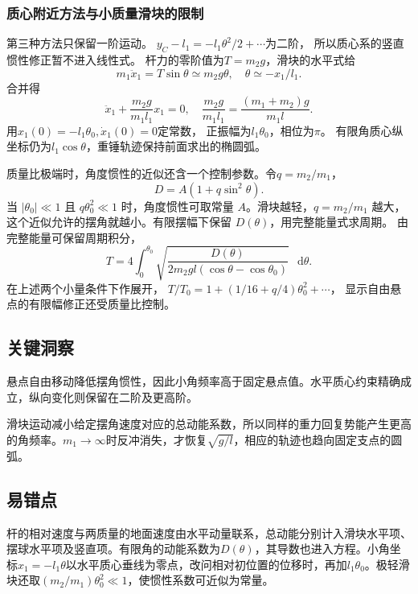 \documentclass[UTF8,fontset=fandol,a4paper,11pt]{ctexart}
\newcommand{\dd}{\mathop{}\!\mathrm{d}}
\begin{document}
\subsubsection*{质心附近方法与小质量滑块的限制}
第三种方法只保留一阶运动。
$y_C-l_1=-l_1\theta^2/2+\cdots$为二阶，
所以质心系的竖直惯性修正暂不进入线性式。
杆力的零阶值为$T=m_2g$，滑块的水平式给
\[
m_1\ddot x_1=T\sin\theta\simeq m_2g\theta,
\quad\theta\simeq-x_1/l_1.
\]
合并得
\[
\ddot x_1+\frac{m_2g}{m_1l_1}x_1=0,
\quad\frac{m_2g}{m_1l_1}=\frac{(m_1+m_2)g}{m_1l}.
\]
用$x_1(0)=-l_1\theta_0,\dot x_1(0)=0$定常数，
正振幅为$l_1\theta_0$，相位为$\pi$。
有限角质心纵坐标仍为$l_1\cos\theta$，重锤轨迹保持前面求出的椭圆弧。

质量比极端时，角度惯性的近似还含一个控制参数。令$q=m_2/m_1$，
\[
D=A(1+q\sin^2\theta).
\]
当 $|\theta_0|\ll1$ 且 $q\theta_0^2\ll1$ 时，角度惯性可取常量 $A$。滑块越轻，$q=m_2/m_1$ 越大，这个近似允许的摆角就越小。有限摆幅下保留 $D(\theta)$，用完整能量式求周期。
由完整能量可保留周期积分，
\[
T=4\int_0^{\theta_0}
\sqrt{\frac{D(\theta)}{2m_2gl(\cos\theta-\cos\theta_0)}}\,\dd\theta.
\]
在上述两个小量条件下作展开，
$T/T_0=1+(1/16+q/4)\theta_0^2+\cdots$，
显示自由悬点的有限幅修正还受质量比控制。




\subsection*{关键洞察}

悬点自由移动降低摆角惯性，因此小角频率高于固定悬点值。水平质心约束精确成立，纵向变化则保留在二阶及更高阶。

滑块运动减小给定摆角速度对应的总动能系数，所以同样的重力回复势能产生更高的角频率。$m_1\to\infty$时反冲消失，才恢复$\sqrt{g/l}$，相应的轨迹也趋向固定支点的圆弧。




\subsection*{易错点}

杆的相对速度与两质量的地面速度由水平动量联系，总动能分别计入滑块水平项、摆球水平项及竖直项。有限角的动能系数为$D(\theta)$，其导数也进入方程。小角坐标$x_1=-l_1\theta$以水平质心垂线为零点，改问相对初位置的位移时，再加$l_1\theta_0$。极轻滑块还取$(m_2/m_1)\theta_0^2\ll1$，使惯性系数可近似为常量。
\end{document}
